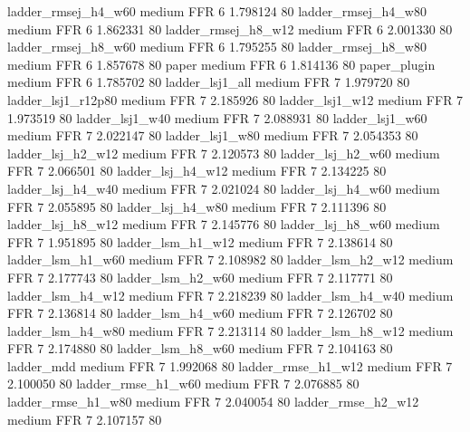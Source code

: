    ladder_rmsej_h4_w60     medium      FFR                 6 1.798124 80
   ladder_rmsej_h4_w80     medium      FFR                 6 1.862331 80
   ladder_rmsej_h8_w12     medium      FFR                 6 2.001330 80
   ladder_rmsej_h8_w60     medium      FFR                 6 1.795255 80
   ladder_rmsej_h8_w80     medium      FFR                 6 1.857678 80
                 paper     medium      FFR                 6 1.814136 80
          paper_plugin     medium      FFR                 6 1.785702 80
       ladder_lsj1_all     medium      FFR                 7 1.979720 80
    ladder_lsj1_r12p80     medium      FFR                 7 2.185926 80
       ladder_lsj1_w12     medium      FFR                 7 1.973519 80
       ladder_lsj1_w40     medium      FFR                 7 2.088931 80
       ladder_lsj1_w60     medium      FFR                 7 2.022147 80
       ladder_lsj1_w80     medium      FFR                 7 2.054353 80
     ladder_lsj_h2_w12     medium      FFR                 7 2.120573 80
     ladder_lsj_h2_w60     medium      FFR                 7 2.066501 80
     ladder_lsj_h4_w12     medium      FFR                 7 2.134225 80
     ladder_lsj_h4_w40     medium      FFR                 7 2.021024 80
     ladder_lsj_h4_w60     medium      FFR                 7 2.055895 80
     ladder_lsj_h4_w80     medium      FFR                 7 2.111396 80
     ladder_lsj_h8_w12     medium      FFR                 7 2.145776 80
     ladder_lsj_h8_w60     medium      FFR                 7 1.951895 80
     ladder_lsm_h1_w12     medium      FFR                 7 2.138614 80
     ladder_lsm_h1_w60     medium      FFR                 7 2.108982 80
     ladder_lsm_h2_w12     medium      FFR                 7 2.177743 80
     ladder_lsm_h2_w60     medium      FFR                 7 2.117771 80
     ladder_lsm_h4_w12     medium      FFR                 7 2.218239 80
     ladder_lsm_h4_w40     medium      FFR                 7 2.136814 80
     ladder_lsm_h4_w60     medium      FFR                 7 2.126702 80
     ladder_lsm_h4_w80     medium      FFR                 7 2.213114 80
     ladder_lsm_h8_w12     medium      FFR                 7 2.174880 80
     ladder_lsm_h8_w60     medium      FFR                 7 2.104163 80
            ladder_mdd     medium      FFR                 7 1.992068 80
    ladder_rmse_h1_w12     medium      FFR                 7 2.100050 80
    ladder_rmse_h1_w60     medium      FFR                 7 2.076885 80
    ladder_rmse_h1_w80     medium      FFR                 7 2.040054 80
    ladder_rmse_h2_w12     medium      FFR                 7 2.107157 80
